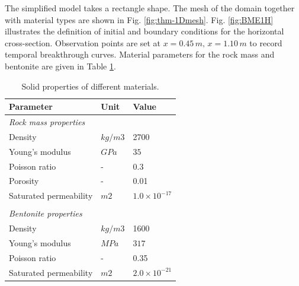 The simplified model takes a rectangle shape. The mesh of the domain together with material types are shown in Fig. \ref{fig:thm-1Dmesh}. Fig. \ref{fig:BME1H} illustrates the definition of initial and boundary conditions for the horizontal cross-section. Observation points are set at $x=0.45\,m, \,x=1.10\,m$ to record temporal breakthrough curves. Material parameters for the rock mass and bentonite are given in Table \ref{tab:hm_rock}.

\begin{table}[!thb]
\begin{center}
\begin{tabular}{lll}
\hline
Parameter   &  Unit  & Value\\
\hline
\textit{Rock mass properties} & & \\
Density &  $kg/m3$ &  2700 \\
Young's modulus &  $GPa$ &  $35$ \\
Poisson ratio & - &  0.3 \\
Porosity & - &  0.01 \\
Saturated permeability &  $m2$  & $1.0\times10^{-17}$ \\
\\
\textit{Bentonite properties} & & \\
Density &  $kg/m3$ &  1600 \\
Young's modulus &  $MPa$ &  $317$\\
Poisson ratio & - &  0.35 \\
Saturated permeability &  $m2$  & $2.0
\times10^{-21}$ \\
\hline
\end{tabular}
\end{center}
\caption{\label{tab:hm_rock}Solid properties of different materials.}
\end{table}

